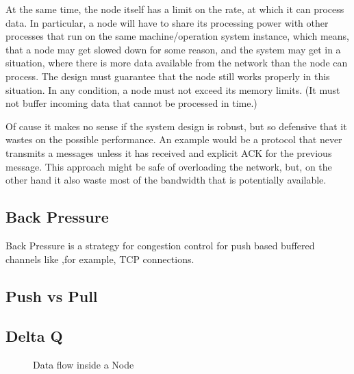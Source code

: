\documentclass{report}
\newcommand{\wip}[1]{\color{magenta}{#1}\color{black}}
\theoremstyle{definition}{
  \newtheorem{lemma}{Lemma}[section] %
  \newtheorem{definition}[lemma]{Definition}
}
\theoremstyle{theorem}{
  \newtheorem{invariant}[lemma]{Invariant}
  \newtheorem{proofobligation}[lemma]{Proof Obligation}
}
\numberwithin{equation}{lemma}
\begin{document}
At the same time, the node itself has a limit on the rate, at which it can process data.
In particular, a node will have to share its processing power with other processes that run on the
same machine/operation system instance, which means, that a node may get slowed down for some reason,
and the system may get in a situation,
where there is more data available from the network than the node can process.
The design must guarantee that the node still works properly in this situation.
In any condition, a node must not exceed its memory limits.
(It must not buffer incoming data that cannot be processed in time.)

Of cause it makes no sense if the system design is robust, but so defensive that it wastes on the possible
performance.
An example would be a protocol that never transmits a messages unless it has received and
explicit ACK for the previous message. This approach might be safe of overloading the network, but,
on the other hand it also waste most of the bandwidth that is potentially available.

\subsection{Back Pressure}
Back Pressure is a strategy for congestion control for push based buffered channels like
,for example, TCP connections.



\wip{TODO: explain the concept of Back pressure and how it is used in the design}
\subsection{Push vs Pull}
\wip{TODO: data flow inside the node is pull based}
\subsection{Delta Q}
\wip{TODO: explain what delta Q means and what it has to do with congestion control.}

\begin{figure}[h]
  \begin{center}
  \end{center}
  \caption{Data flow inside a Node}
  \label{node-diagram-concurency}
\end{figure}
\end{document}
